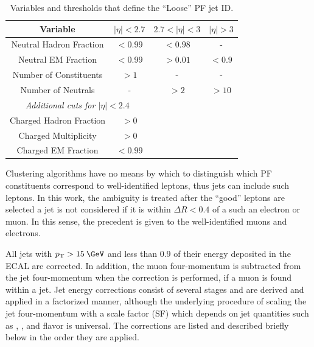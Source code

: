 \begin{table}[!ht]
  \centering
  \begin{tabular}{|c|c|c|c|}
    \hline
    Variable                     &  $|\eta|<2.7$ & $2.7<|\eta|<3$ & $|\eta|>3$ \\
    \hline
    Neutral Hadron Fraction      & $<0.99$       & $<0.98$        & -      \\
    Neutral EM Fraction          & $<0.99$       & $>0.01$        & $<0.9$ \\
    Number of Constituents       & $>1$          & -              & -      \\
    Number of Neutrals           & -             & $>2$           & $>10$  \\
    \hline
    \multicolumn{2}{|c|}{\emph{Additional cuts for $|\eta|<2.4$}} && \\
    \hline
    Charged Hadron Fraction      & $>0$         &&  \\
    Charged Multiplicity         & $>0$         &&  \\
    Charged EM Fraction          & $<0.99$      &&  \\
    \hline
  \end{tabular}
  \caption{Variables and thresholds that define the ``Loose'' PF jet ID.}
  \label{tab:jetid}
\end{table}

Clustering algorithms have no means by which to distinguish which PF constituents correspond to well-identified leptons, thus jets can include such leptons. In this work, the ambiguity is treated after the ``good'' leptons are selected a jet is not considered if it is within $\Delta R<0.4$ of a such an electron or muon. In this sense, the precedent is given to the well-identified muons and electrons.

All jets with $\pt > 15\:\GeV$ and less than 0.9 of their energy deposited in the ECAL are corrected. In addition, the muon four-momentum is subtracted from the jet four-momentum when the correction is performed, if a muon is found within a jet. Jet energy corrections consist of several stages and are derived and applied in a factorized manner, although the underlying procedure of scaling the jet four-momentum with a scale factor (SF) which depends on jet quantities such as \pt, \eta, and flavor is universal. The corrections are listed and described briefly below in the order they are applied.

